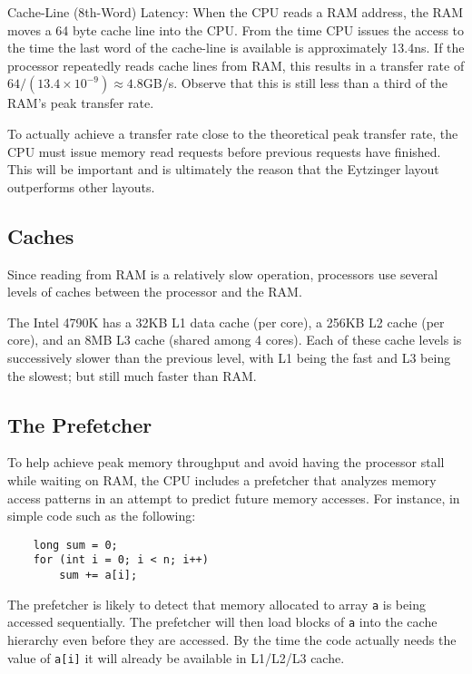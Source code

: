 \documentclass{patmorin}
\begin{document}
Cache-Line (8th-Word) Latency:  When the CPU reads a RAM address, the
RAM moves a 64 byte cache line into the CPU. From the time CPU issues
the access to the time the last word of the cache-line is available is
approximately 13.4ns.  If the processor repeatedly reads cache lines
from RAM, this results in a transfer rate of $64 / (13.4\times10^{-9})
\approx 4.8$GB/s.  Observe that this is still less than a third of the
RAM's peak transfer rate.

To actually achieve a transfer rate close to the theoretical peak transfer
rate, the CPU must issue memory read requests before previous requests
have finished. This will be important and is ultimately the reason that
the Eytzinger layout outperforms other layouts.

\subsection{Caches}

Since reading from RAM is a relatively slow operation, processors use
several levels of caches between the processor and the RAM.

The Intel 4790K has a 32KB L1 data cache (per core), a 256KB L2 cache
(per core), and an 8MB L3 cache (shared among 4 cores).  Each of these
cache levels is successively slower than the previous level, with L1 being
the fast and L3 being the slowest; but still much faster than RAM.

\subsection{The Prefetcher}

To help achieve peak memory throughput and avoid having the processor
stall while waiting on RAM, the CPU includes a prefetcher that analyzes
memory access patterns in an attempt to predict future memory accesses.
For instance, in simple code such as the following:

\begin{verbatim}
    long sum = 0;
    for (int i = 0; i < n; i++) 
        sum += a[i];
\end{verbatim}

The prefetcher is likely to detect that memory allocated to array
\texttt{a} is being accessed sequentially.  The prefetcher will
then load blocks of \texttt{a} into the cache hierarchy even
before they are accessed.  By the time the code actually needs the value
of \texttt{a[i]} it will already be available in L1/L2/L3 cache.
\end{document}
